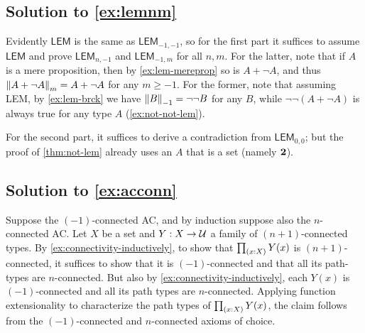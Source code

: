\documentclass[
%
%
11pt %
]{article}
\begin{document}
\subsection*{Solution to \autoref{ex:lemnm}}

Evidently $\mathsf{LEM}$ is the same as $\mathsf{LEM}_{-1,-1}$, so for the first part it suffices to assume $\mathsf{LEM}$ and prove $\mathsf{LEM}_{n,-1}$ and $\mathsf{LEM}_{-1,m}$ for all $n,m$.
For the latter, note that if $A$ is a mere proposition, then by \autoref{ex:lem-mereprop} so is $A+\neg A$, and thus $\trunc m{A+\neg A}= A+\neg A$ for any $m\ge -1$.
For the former, note that assuming LEM, by \autoref{ex:lem-brck} we have $\trunc{-1}{B} = \neg\neg B$ for any $B$, while $\neg\neg(A+\neg A)$ is always true for any type $A$ (\autoref{ex:not-not-lem}).

For the second part, it suffices to derive a contradiction from $\mathsf{LEM}_{0,0}$; but the proof of \autoref{thm:not-lem} already uses an $A$ that is a set (namely $\bool$).

\subsection*{Solution to \autoref{ex:acconn}}

Suppose the $(-1)$-connected AC, and by induction suppose also the $n$-connected AC.
Let $X$ be a set and $Y:X\to \type$ a family of $(n+1)$-connected types.
By \autoref{ex:connectivity-inductively}, to show that $\prd{x:X} Y(x)$ is $(n+1)$-connected, it suffices to show that it is $(-1)$-connected and that all its path-types are $n$-connected.
But also by \autoref{ex:connectivity-inductively}, each $Y(x)$ is $(-1)$-connected and all its path types are $n$-connected.
Applying function extensionality to characterize the path types of $\prd{x:X} Y(x)$, the claim follows from the $(-1)$-connected and $n$-connected axioms of choice.
\end{document}
